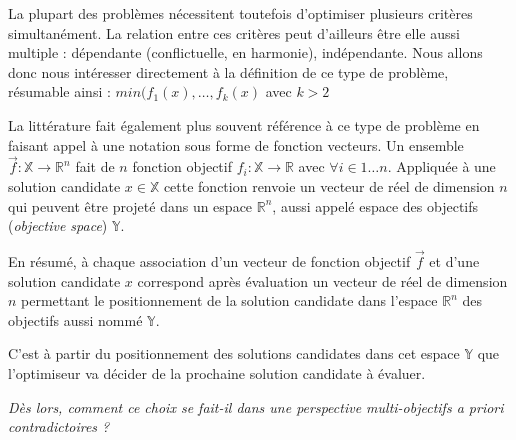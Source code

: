 \sloppy La plupart des problèmes nécessitent toutefois d'optimiser plusieurs critères simultanément. La relation entre ces critères peut d'ailleurs être elle aussi multiple : dépendante (conflictuelle, en harmonie), indépendante. Nous allons donc nous intéresser directement à la définition de ce type de problème, résumable ainsi :  $min(f_1(x), \dotsc, f_k(x)$ avec $k > 2$

La littérature fait également plus souvent référence à ce type de problème en faisant appel à une notation sous forme de fonction vecteurs. Un ensemble $\vec{f} : \mathbb{X} \to \mathbb{R}^n$ fait de $n$ fonction objectif $f_i : \mathbb{X} \to \mathbb{R}$ avec $\forall i \in 1 \dotsc n$. Appliquée à une solution candidate $x \in \mathbb{X}$ cette fonction renvoie un vecteur de réel de dimension $n$ qui peuvent être projeté dans un espace $\mathbb{R}^n$, aussi appelé espace des objectifs (\textit{objective space}) $\mathbb{Y}$.

En résumé, à chaque association d'un vecteur de fonction objectif $\vec{f}$ et d'une solution candidate $x$ correspond après évaluation un vecteur de réel de dimension $n$ permettant le positionnement de la solution candidate dans l'espace $\mathbb{R}^n$ des objectifs aussi nommé $\mathbb{Y}$.

C'est à partir du positionnement des solutions candidates dans cet espace $\mathbb{Y}$ que l'optimiseur va décider de la prochaine solution candidate à évaluer.
\medskip

\textit{Dès lors, comment ce choix se fait-il dans une perspective multi-objectifs a priori contradictoires ?}


